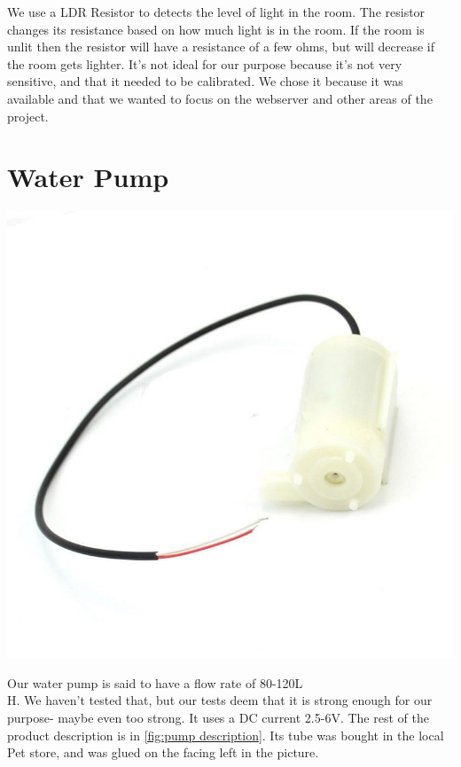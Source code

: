 \documentclass[a4paper,12pt,twoside,openright,titlepage]{book}
\begin{document}
We use a LDR Resistor to detects the level of light in the room. The resistor changes its resistance based on how much light is in the room. If the room is unlit then the resistor will have a resistance of a few ohms, but will decrease if the room gets lighter. It's not ideal for our purpose because it's not very sensitive, and that it needed to be calibrated. We chose it because it was available and that we wanted to focus on the webserver and other areas of the project.

\section{Water Pump}
\begin{center}
	\includegraphics[scale=0.3]{Water-Pump}
\end{center}

Our water pump is said to have a flow rate of 80-120L\\H. We haven't tested that, but our tests deem that it is strong enough for our purpose- maybe even too strong. It uses a DC current 2.5-6V. The rest of the product description is in \ref{fig:pump description}. Its tube was bought in the local Pet store, and was glued on the facing  left in the picture.
\end{document}
